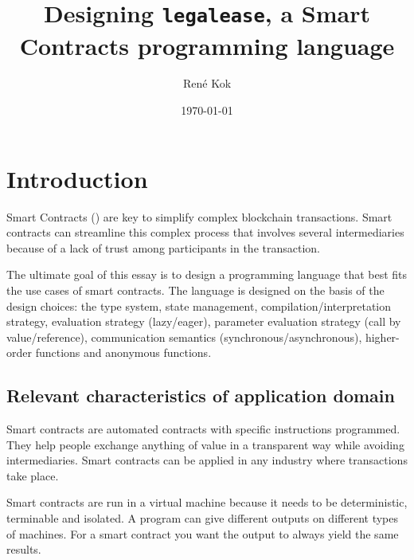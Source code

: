 \documentclass{uva-inf-article}
\title{Designing \texttt{legalease}, a Smart Contracts programming language}
\author{René Kok}
\date{\today}
\begin{document}
\maketitle




\section{Introduction}
Smart Contracts (\cite{what-are-smart-contracts}) are key to simplify complex blockchain transactions.
Smart contracts can streamline this complex process that involves several intermediaries because of a 
lack of trust among participants in the transaction.

The ultimate goal of this essay is to design a programming language that best fits the use cases of smart contracts.
The language is designed on the basis of the design choices: 
the type system,
state management,
compilation/interpretation strategy,
evaluation strategy (lazy/eager),
parameter evaluation strategy (call by value/reference),
communication semantics (synchronous/asynchronous),
higher-order functions and anonymous functions.

\subsection{Relevant characteristics of application domain}
Smart contracts are automated contracts with specific instructions programmed. 
They help people exchange anything of value in a transparent way while avoiding intermediaries.
Smart contracts can be applied in any industry where transactions take place.

Smart contracts are run in a virtual machine because it needs to be deterministic, terminable and isolated.
A program can give different outputs on different types of machines.
For a smart contract you want the output to always yield the same results.
\end{document}
